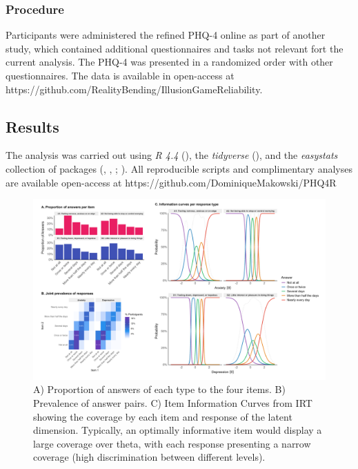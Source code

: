 \documentclass[
  jou,
  floatsintext,
  longtable,
  nolmodern,
  notxfonts,
  notimes,
  colorlinks=true,linkcolor=blue,citecolor=blue,urlcolor=blue]{apa7}
\begin{document}
\subsubsection{Procedure}\label{procedure}

Participants were administered the refined PHQ-4 online as part of
another study, which contained additional questionnaires and tasks not
relevant fort the current analysis. The PHQ-4 was presented in a
randomized order with other questionnaires. The data is available in
open-access at
https://github.com/RealityBending/IllusionGameReliability.

\subsection{Results}\label{results}

The analysis was carried out using \emph{R 4.4}
(), the \emph{tidyverse}
(), and the
\emph{easystats} collection of packages
(,
,
;
). All
reproducible scripts and complimentary analyses are available
open-access at https://github.com/DominiqueMakowski/PHQ4R

\begin{figure}[!htbp]

{\caption{{A) Proportion of answers of each type to the four items. B)
Prevalence of answer pairs. C) Item Information Curves from IRT showing
the coverage by each item and response of the latent dimension.
Typically, an optimally informative item would display a large coverage
over theta, with each response presenting a narrow coverage (high
discrimination between different levels).}{\label{fig-one}}}}

\includegraphics[width=1\textwidth,height=\textheight]{../../study1/figures/figure1.png}

\end{figure}
\end{document}

